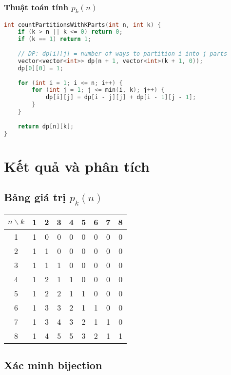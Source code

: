 \documentclass[12pt,a4paper]{article}
\theoremstyle{definition}
\begin{document}
\subsubsection{Thuật toán tính $p_k(n)$}

\begin{lstlisting}[language=C++, caption=Calculate number of partitions $p_k(n)$]
int countPartitionsWithKParts(int n, int k) {
    if (k > n || k <= 0) return 0;
    if (k == 1) return 1;
    
    // DP: dp[i][j] = number of ways to partition i into j parts
    vector<vector<int>> dp(n + 1, vector<int>(k + 1, 0));
    dp[0][0] = 1;
    
    for (int i = 1; i <= n; i++) {
        for (int j = 1; j <= min(i, k); j++) {
            dp[i][j] = dp[i - j][j] + dp[i - 1][j - 1];
        }
    }
    
    return dp[n][k];
}

\end{lstlisting}

\section{Kết quả và phân tích}

\subsection{Bảng giá trị $p_k(n)$}

\begin{center}
\begin{tabular}{|c|c|c|c|c|c|c|c|c|}
\hline
$n \backslash k$ & 1 & 2 & 3 & 4 & 5 & 6 & 7 & 8 \\
\hline
1 & 1 & 0 & 0 & 0 & 0 & 0 & 0 & 0 \\
\hline
2 & 1 & 1 & 0 & 0 & 0 & 0 & 0 & 0 \\
\hline
3 & 1 & 1 & 1 & 0 & 0 & 0 & 0 & 0 \\
\hline
4 & 1 & 2 & 1 & 1 & 0 & 0 & 0 & 0 \\
\hline
5 & 1 & 2 & 2 & 1 & 1 & 0 & 0 & 0 \\
\hline
6 & 1 & 3 & 3 & 2 & 1 & 1 & 0 & 0 \\
\hline
7 & 1 & 3 & 4 & 3 & 2 & 1 & 1 & 0 \\
\hline
8 & 1 & 4 & 5 & 5 & 3 & 2 & 1 & 1 \\
\hline
\end{tabular}
\end{center}

\subsection{Xác minh bijection}
\end{document}
